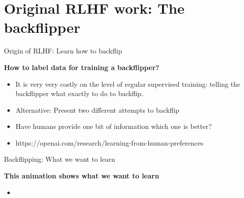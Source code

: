 \section{Original RLHF work: The backflipper}

\begin{vbframe}{Origin of RLHF: Learn how to backflip}

\vfill

\textbf{How to label data for training a backflipper?}

	\begin{itemize}
		\item It is very very costly on the level of
		regular supervised training: telling the
		backflipper what exactly to do to backflip.
                \item Alternative: Present two different
		attempts to backflip
                \item Have humans provide one bit of
		information which one is better?
\item https://openai.com/research/learning-from-human-preferences
	\end{itemize}

\vfill

\end{vbframe}


\begin{vbframe}{Backflipping: What we want to learn}

\vfill

\textbf{This animation shows what we want to learn}

	\begin{itemize}
		\item \href{https://images.openai.com/blob/cf6fdf49-ea9e-489d-a1f1-9753291cd09e/humanfeedbackjump.gif}{}

	\end{itemize}

\vfill

\end{vbframe}


